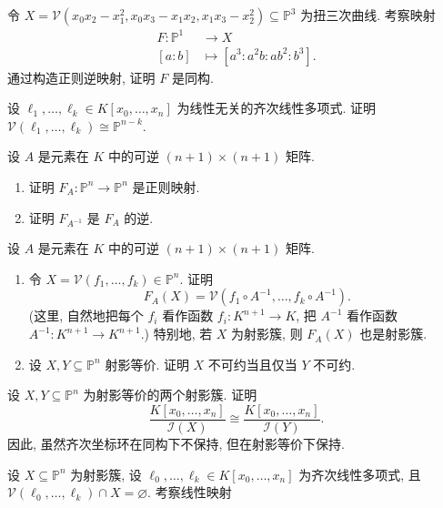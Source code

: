 \BookExerciseHeading
\begin{BookExercises}
  \item\label{ex:twisted-cubic-isomorphic-to-projective-line} 令 $X=\mathcal{V}(x_{0}x_{2}-x_{1}^{2},x_{0}x_{3}-x_{1}x_{2},x_{1}x_{3}-x_{2}^{2})\subseteq\mathbb{P}^{3}$ 为扭三次曲线. 考察映射
  \[
    \begin{aligned}
      F:\mathbb{P}^{1}&\to X\\
      [a:b]&\mapsto[a^{3}:a^{2}b:ab^{2}:b^{3}].
    \end{aligned}
  \]
  通过构造正则逆映射, 证明 $F$ 是同构.
  \item\label{ex:linear-variety-of-independent-polynomials-is-projective-space} 设 $\ell_{1},\ldots,\ell_{k}\in K[x_{0},\ldots,x_{n}]$ 为线性无关的齐次线性多项式. 证明 $\mathcal{V}(\ell_{1},\ldots,\ell_{k})\cong\mathbb{P}^{n-k}$.
  \item\label{ex:invertible-matrix-induces-projective-isomorphism} 设 $A$ 是元素在 $K$ 中的可逆 $(n+1)\times(n+1)$ 矩阵.
  \begin{enumerate}
    \item 证明 $F_{A}:\mathbb{P}^{n}\to\mathbb{P}^{n}$ 是正则映射.
    \item 证明 $F_{A^{-1}}$ 是 $F_{A}$ 的逆.
  \end{enumerate}
  \item\label{ex:projective-equivalence-preserves-varieties} 设 $A$ 是元素在 $K$ 中的可逆 $(n+1)\times(n+1)$ 矩阵.
  \begin{enumerate}
    \item 令 $X=\mathcal{V}(f_{1},\ldots,f_{k})\in\mathbb{P}^{n}$. 证明
    \[
      F_{A}(X)=\mathcal{V}(f_{1}\circ A^{-1},\ldots,f_{k}\circ A^{-1}).
    \]
    (这里, 自然地把每个 $f_{i}$ 看作函数 $f_{i}:K^{n+1}\to K$, 把 $A^{-1}$ 看作函数 $A^{-1}:K^{n+1}\to K^{n+1}$.) 特别地, 若 $X$ 为射影簇, 则 $F_{A}(X)$ 也是射影簇.
    \item 设 $X,Y\subseteq\mathbb{P}^{n}$ 射影等价. 证明 $X$ 不可约当且仅当 $Y$ 不可约.
  \end{enumerate}
  \item\label{ex:projective-equivalence-preserves-homogeneous-coordinate-ring} 设 $X,Y\subseteq\mathbb{P}^{n}$ 为射影等价的两个射影簇. 证明
  \[
    \frac{K[x_{0},\ldots,x_{n}]}{\mathcal{I}(X)}
    \cong
    \frac{K[x_{0},\ldots,x_{n}]}{\mathcal{I}(Y)}.
  \]
  因此, 虽然齐次坐标环在同构下不保持, 但在射影等价下保持.
  \item\label{ex:normal-form-and-finite-fibres-of-projective-linear-map} 设 $X\subseteq\mathbb{P}^{n}$ 为射影簇, 设 $\ell_{0},\ldots,\ell_{k}\in K[x_{0},\ldots,x_{n}]$ 为齐次线性多项式, 且 $\mathcal{V}(\ell_{0},\ldots,\ell_{k})\cap X=\varnothing$. 考察线性映射

\end{BookExercises}
